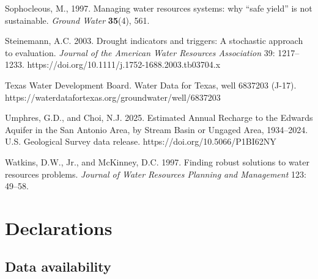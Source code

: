 \documentclass[11pt]{article}
\begin{document}
Sophocleous, M., 1997. Managing water resources systems: why ``safe yield'' is not
sustainable. \emph{Ground Water} \textbf{35}(4), 561.

Steinemann, A.C. 2003. Drought indicators and triggers: A stochastic
approach to evaluation. \emph{Journal of the American Water Resources
Association} 39: 1217--1233.
https://doi.org/10.1111/j.1752-1688.2003.tb03704.x

Texas Water Development Board. Water Data for Texas, well 6837203
(J-17). https://waterdatafortexas.org/groundwater/well/6837203

Umphres, G.D., and Choi, N.J. 2025. Estimated Annual Recharge to the
Edwards Aquifer in the San Antonio Area, by Stream Basin or Ungaged
Area, 1934--2024. U.S. Geological Survey data release.
https://doi.org/10.5066/P1BI62NY

Watkins, D.W., Jr., and McKinney, D.C. 1997. Finding robust solutions to
water resources problems. \emph{Journal of Water Resources Planning and
Management} 123: 49--58.

\section*{Declarations}

\subsection*{Data availability}
\end{document}
